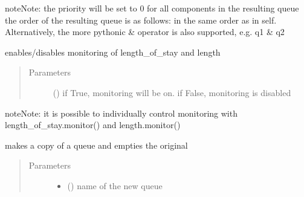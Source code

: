 \documentclass[letterpaper,10pt,english]{sphinxmanual}
\begin{document}
\begin{fulllineitems}
\begin{fulllineitems}
\begin{quote}
\begin{description}
\end{description}\end{quote}

\begin{sphinxadmonition}{note}{Note:}
the priority will be set to 0 for all components in the
resulting  queue 
the order of the resulting queue is as follows: 
in the same order as in self. 
Alternatively, the more pythonic \& operator is also supported, e.g. q1 \& q2
\end{sphinxadmonition}

\end{fulllineitems}


\begin{fulllineitems}
\label{\detokenize{Reference:salabim.Queue.monitor}}
enables/disables monitoring of length\_of\_stay and length
\begin{quote}\begin{description}
\item[{Parameters}] \leavevmode
{} () \textendash{} if True, monitoring will be on. 
if False, monitoring is disabled 

\end{description}\end{quote}

\begin{sphinxadmonition}{note}{Note:}
it is possible to individually control monitoring with length\_of\_stay.monitor() and length.monitor()
\end{sphinxadmonition}

\end{fulllineitems}


\begin{fulllineitems}
\label{\detokenize{Reference:salabim.Queue.move}}
makes a copy of a queue and empties the original
\begin{quote}\begin{description}
\item[{Parameters}] \leavevmode\begin{itemize}
\item {} 
 () \textendash{} name of the new queue


\end{itemize}
\end{description}
\end{quote}
\end{fulllineitems}
\end{fulllineitems}
\end{document}
